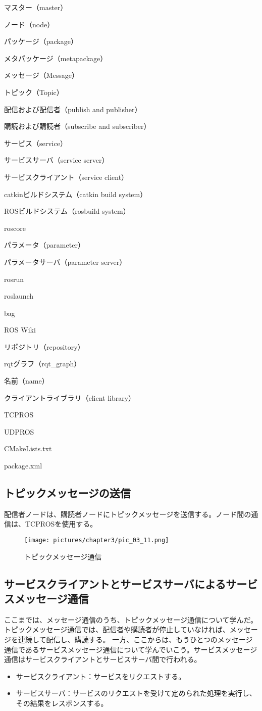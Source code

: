 \begin{term}{マスター（master）}
\begin{term}{ノード（node）}
\begin{term}{パッケージ（package）}
\begin{term}{メタパッケージ（metapackage）}
\begin{term}{メッセージ（Message）}
\begin{term}{トピック（Topic）}
\begin{term}{配信および配信者（publish and publisher）}
\begin{term}{購読および購読者（subscribe and subscriber）}
\begin{term}{サービス（service）}
\begin{term}{サービスサーバ（service server）}
\begin{term}{サービスクライアント（service client）}
\begin{term}{catkinビルドシステム（catkin build system）}
\begin{term}{ROSビルドシステム（rosbuild system）}
\begin{term}{roscore}
\begin{term}{パラメータ（parameter）}
\begin{term}{パラメータサーバ（parameter server）}
\begin{term}{rosrun}
\begin{term}{roslaunch}
\begin{term}{bag}
\begin{term}{ROS Wiki}
\begin{term}{リポジトリ（repository）}
\begin{term}{rqtグラフ（rqt\_graph）}
\begin{term}{名前（name）}
\begin{term}{クライアントライブラリ（client library）}
\begin{term}{TCPROS}
\begin{term}{UDPROS}
\begin{term}{CMakeLists.txt}
\begin{term}{package.xml}
\subsection{トピックメッセージの送信}
配信者ノードは、購読者ノードにトピックメッセージを送信する。ノード間の通信は、TCPROSを使用する。

\begin{figure}[h]
  \centering
  \texttt{[image: pictures/chapter3/pic\_03\_11.png]}
  \caption{トピックメッセージ通信}
\end{figure}

\subsection{サービスクライアントとサービスサーバによるサービスメッセージ通信}

ここまでは、メッセージ通信のうち、トピックメッセージ通信について学んだ。トピックメッセージ通信では、配信者や購読者が停止していなければ、メッセージを連続して配信し、購読する。
一方、ここからは、もうひとつのメッセージ通信であるサービスメッセージ通信について学んでいこう。サービスメッセージ通信はサービスクライアントとサービスサーバ間で行われる。
\\
\begin{itemize}
\item サービスクライアント：サービスをリクエストする。
\item サービスサーバ：サービスのリクエストを受けて定められた処理を実行し、その結果をレスポンスする。
\end{itemize}
\vspace{\baselineskip}


\end{term}
\end{term}
\end{term}
\end{term}
\end{term}
\end{term}
\end{term}
\end{term}
\end{term}
\end{term}
\end{term}
\end{term}
\end{term}
\end{term}
\end{term}
\end{term}
\end{term}
\end{term}
\end{term}
\end{term}
\end{term}
\end{term}
\end{term}
\end{term}
\end{term}
\end{term}
\end{term}
\end{term}
